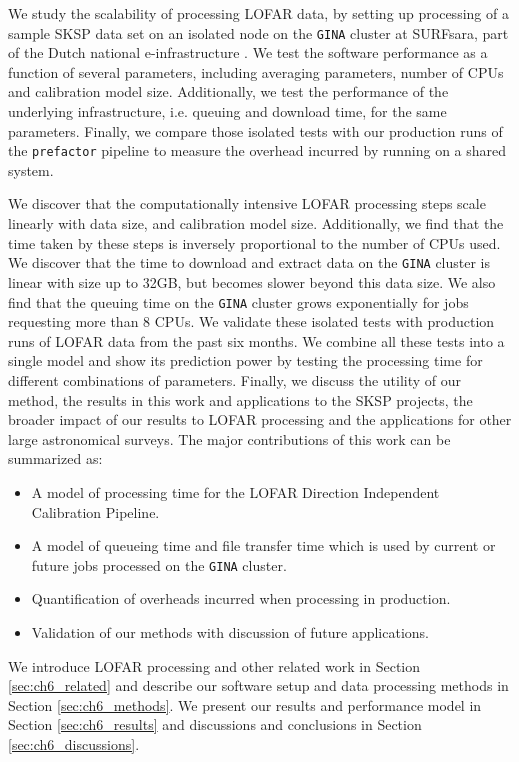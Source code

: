We study the scalability of processing LOFAR data, by setting up processing of a sample SKSP data set on an isolated node on the \texttt{GINA} cluster at SURFsara, part of the Dutch national e-infrastructure \citep{dutch_einfra}. We test the software performance as a function of several parameters, including averaging parameters, number of CPUs and calibration model size. Additionally, we test the performance of the underlying infrastructure, i.e. queuing  and download time, for the same parameters. Finally, we compare those isolated tests with our production runs of the \texttt{prefactor} pipeline to measure the overhead incurred by running on a shared system. 

We discover that the computationally intensive LOFAR processing steps scale linearly with data size, and calibration model size. Additionally, we find that the time taken by these steps is inversely proportional to the number of CPUs used. We discover that the time to download and extract data on the \texttt{GINA} cluster is linear with size up to 32GB, but becomes slower beyond this data size. We also find that the queuing time on the \texttt{GINA} cluster grows exponentially for jobs requesting more than 8 CPUs. We validate these isolated tests with production runs of LOFAR data from the past six months. We combine all these tests into a single model and show its prediction power by testing the processing time for different combinations of parameters. Finally, we discuss the utility of our method, the results in this work and applications to the SKSP projects, the broader impact of our results to LOFAR processing and the applications for other large astronomical surveys. The major contributions of this work can be summarized as:

\begin{itemize}
    \item A model of processing time for the  LOFAR Direction Independent Calibration Pipeline.
    \item A model of queueing time and file transfer time which is used by current or future jobs processed on the \texttt{GINA} cluster.
    \item Quantification of overheads incurred when processing in production. 
    \item Validation of our methods with discussion of future applications. 
\end{itemize}

We introduce LOFAR processing and other related work in Section \ref{sec:ch6_related} and describe our software setup and data processing methods in Section \ref{sec:ch6_methods}. We present our results and performance model in Section \ref{sec:ch6_results} and discussions and conclusions in Section \ref{sec:ch6_discussions}. 

